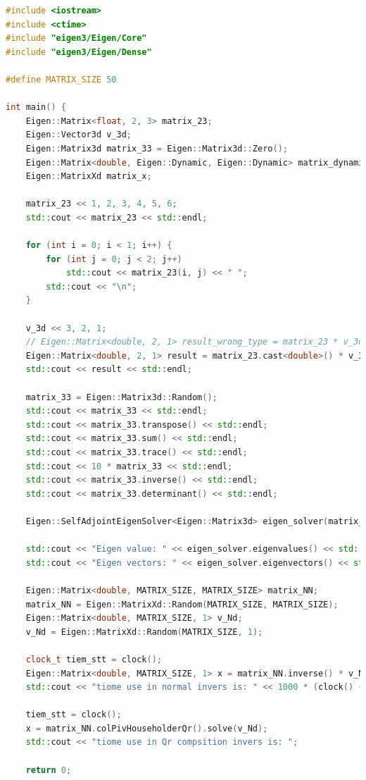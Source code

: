 \begin{lstlisting}[language=C++]
#include <iostream>
#include <ctime>
#include "eigen3/Eigen/Core"
#include "eigen3/Eigen/Dense"

#define MATRIX_SIZE 50

int main() {
    Eigen::Matrix<float, 2, 3> matrix_23;
    Eigen::Vector3d v_3d;
    Eigen::Matrix3d matrix_33 = Eigen::Matrix3d::Zero();
    Eigen::Matrix<double, Eigen::Dynamic, Eigen::Dynamic> matrix_dynamic;
    Eigen::MatrixXd matrix_x;

    matrix_23 << 1, 2, 3, 4, 5, 6;
    std::cout << matrix_23 << std::endl;

    for (int i = 0; i < 1; i++) {
        for (int j = 0; j < 2; j++)
            std::cout << matrix_23(i, j) << " ";
        std::cout << "\n";
    }

    v_3d << 3, 2, 1;
    // Eigen::Matrix<double, 2, 1> result_wrong_type = matrix_23 * v_3d;
    Eigen::Matrix<double, 2, 1> result = matrix_23.cast<double>() * v_3d;
    std::cout << result << std::endl;

    matrix_33 = Eigen::Matrix3d::Random();
    std::cout << matrix_33 << std::endl;
    std::cout << matrix_33.transpose() << std::endl;
    std::cout << matrix_33.sum() << std::endl;
    std::cout << matrix_33.trace() << std::endl;
    std::cout << 10 * matrix_33 << std::endl;
    std::cout << matrix_33.inverse() << std::endl;
    std::cout << matrix_33.determinant() << std::endl;

    Eigen::SelfAdjointEigenSolver<Eigen::Matrix3d> eigen_solver(matrix_33.transpose() * matrix_33);

    std::cout << "Eigen value: " << eigen_solver.eigenvalues() << std::endl;
    std::cout << "Eigen vectors: " << eigen_solver.eigenvectors() << std::endl;

    Eigen::Matrix<double, MATRIX_SIZE, MATRIX_SIZE> matrix_NN;
    matrix_NN = Eigen::MatrixXd::Random(MATRIX_SIZE, MATRIX_SIZE);
    Eigen::Matrix<double, MATRIX_SIZE, 1> v_Nd;
    v_Nd = Eigen::MatrixXd::Random(MATRIX_SIZE, 1);

    clock_t tiem_stt = clock();
    Eigen::Matrix<double, MATRIX_SIZE, 1> x = matrix_NN.inverse() * v_Nd;
    std::cout << "tiome use in normal invers is: " << 1000 * (clock() - tiem_stt) / (double)CLOCKS_PER_SEC << "ms" << std::endl;

    tiem_stt = clock();
    x = matrix_NN.colPivHouseholderQr().solve(v_Nd);
    std::cout << "tiome use in Qr compsition invers is: ";

    return 0;
\end{lstlisting}


